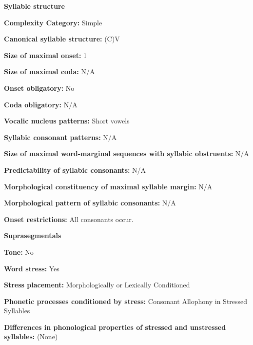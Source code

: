 \textbf{Syllable structure}



\textbf{Complexity Category:} Simple



\textbf{Canonical syllable structure:} (C)V \citep[7]{Dutton1996}



\textbf{Size of maximal onset:} 1



\textbf{Size of maximal coda:} N/A



\textbf{Onset obligatory:} No



\textbf{Coda obligatory:} N/A



\textbf{Vocalic nucleus patterns:} Short vowels



\textbf{Syllabic consonant patterns:} N/A



\textbf{Size of maximal word{}-marginal sequences with syllabic obstruents:} N/A



\textbf{Predictability of syllabic consonants:} N/A



\textbf{Morphological constituency of maximal syllable margin:} N/A



\textbf{Morphological pattern of syllabic consonants:} N/A



\textbf{Onset restrictions:} All consonants occur.



\textbf{Suprasegmentals}



\textbf{Tone:} No



\textbf{Word stress:} Yes



\textbf{Stress placement:} Morphologically or Lexically Conditioned



\textbf{Phonetic processes conditioned by stress:} Consonant Allophony in Stressed Syllables



\textbf{Differences in phonological properties of stressed and unstressed syllables:} (None) 



